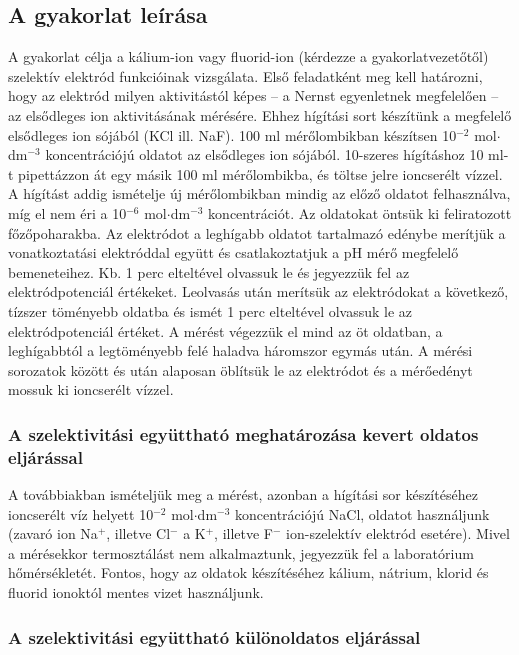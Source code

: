 \subsection{A gyakorlat leírása}
A gyakorlat célja a kálium-ion vagy fluorid-ion (kérdezze a gyakorlatvezetőtől) szelektív elektród funkcióinak vizsgálata.
Első feladatként meg kell határozni, hogy az elektród milyen aktivitástól képes – a Nernst egyenletnek megfelelően – az elsődleges ion aktivitásának mérésére.
Ehhez hígítási sort készítünk a megfelelő elsődleges ion sójából (KCl ill. NaF).
100 ml mérőlombikban készítsen 10$^{-2}$ mol$\cdot$dm$^{-3}$ koncentrációjú oldatot az elsődleges ion sójából.
10-szeres hígításhoz 10 ml-t pipettázzon át egy másik 100 ml mérőlombikba, és töltse jelre ioncserélt vízzel.
A hígítást addig ismételje új mérőlombikban mindig az előző oldatot felhasználva, míg el nem éri a 10$^{-6}$ mol$\cdot$dm$^{-3}$ koncentrációt.
Az oldatokat öntsük ki feliratozott főzőpoharakba.
Az elektródot a leghígabb oldatot tartalmazó edénybe merítjük a vonatkoztatási elektróddal együtt és csatlakoztatjuk a pH mérő megfelelő bemeneteihez.
Kb. 1 perc elteltével olvassuk le és jegyezzük fel az elektródpotenciál értékeket.
Leolvasás után merítsük az elektródokat a következő, tízszer töményebb oldatba és ismét 1 perc elteltével olvassuk le az elektródpotenciál értéket.
A mérést végezzük el mind az öt oldatban, a leghígabbtól a legtöményebb felé haladva háromszor egymás után.
A mérési sorozatok között és után alaposan öblítsük le az elektródot és a mérőedényt mossuk ki ioncserélt vízzel.

\subsubsection{A szelektivitási együttható meghatározása kevert oldatos eljárással}

A továbbiakban ismételjük meg a mérést, azonban a hígítási sor készítéséhez ioncserélt víz helyett 10$^{-2}$ mol$\cdot$dm$^{-3}$ koncentrációjú NaCl, oldatot használjunk (zavaró ion Na$^+$, illetve Cl$^-$ a K$^+$, illetve F$^-$ ion-szelektív elektród esetére).
Mivel a mérésekkor termosztálást nem alkalmaztunk, jegyezzük fel a laboratórium hőmérsékletét.
Fontos, hogy az oldatok készítéséhez kálium, nátrium, klorid és fluorid ionoktól mentes vizet használjunk.

\subsubsection{A szelektivitási együttható különoldatos eljárással}

